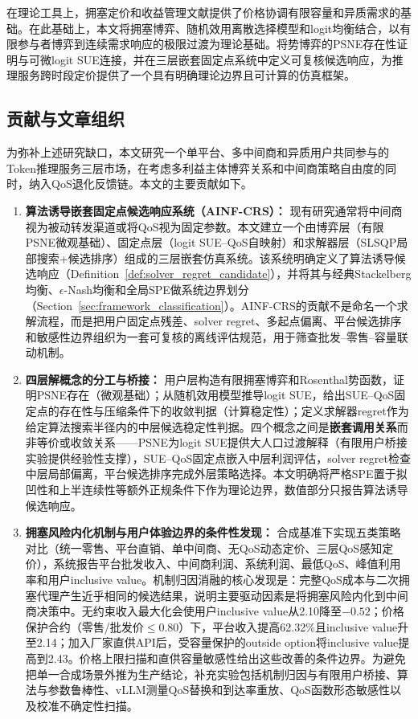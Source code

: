 \documentclass[UTF8,11pt]{ctexart}
\begin{document}
在理论工具上，拥塞定价和收益管理文献提供了价格协调有限容量和异质需求的基础\cite{vickrey1969congestion,gallego1994dynamic,elmaghraby2003dynamic,bitran2003overview,talluri2004revenue,phillips2005pricing}。在此基础上，本文将拥塞博弈、随机效用离散选择模型和logit均衡结合，以有限参与者博弈到连续需求响应的极限过渡为理论基础\cite{rosenthal1973class,monderer1996potential,wardrop1952some,sandholm2010population,mcfadden1974conditional,train2009discrete}。将势博弈的PSNE存在性证明与可微logit SUE连接，并在三层嵌套固定点系统中定义可复核候选响应，为推理服务跨时段定价提供了一个具有明确理论边界且可计算的仿真框架。

\subsection{贡献与文章组织}

为弥补上述研究缺口，本文研究一个单平台、多中间商和异质用户共同参与的Token推理服务三层市场，在考虑多利益主体博弈关系和中间商策略自由度的同时，纳入QoS退化反馈链。本文的主要贡献如下。

\begin{enumerate}[leftmargin=2em]
  \item \textbf{算法诱导嵌套固定点候选响应系统（AINF-CRS）：} 现有研究通常将中间商视为被动转发渠道或将QoS视为固定参数。本文建立一个由博弈层（有限PSNE微观基础）、固定点层（logit SUE--QoS自映射）和求解器层（SLSQP局部搜索+候选排序）组成的三层嵌套仿真系统。该系统明确定义了算法诱导候选响应（Definition~\ref{def:solver_regret_candidate}），并将其与经典Stackelberg均衡、$\epsilon$-Nash均衡和全局SPE做系统边界划分（Section~\ref{sec:framework_classification}）。AINF-CRS的贡献不是命名一个求解流程，而是把用户固定点残差、solver regret、多起点偏离、平台候选排序和敏感性边界组织为一套可复核的离线评估规范，用于筛查批发--零售--容量联动机制。
  \item \textbf{四层解概念的分工与桥接：} 用户层构造有限拥塞博弈和Rosenthal势函数，证明PSNE存在（微观基础）；从随机效用模型推导logit SUE，给出SUE--QoS固定点的存在性与压缩条件下的收敛判据（计算稳定性）；定义求解器regret作为给定算法搜索半径内的中层候选稳定性判据。四个概念之间是\textbf{嵌套调用关系}而非等价或收敛关系——PSNE为logit SUE提供大人口过渡解释（有限用户桥接实验提供经验性支撑），SUE--QoS固定点嵌入中层利润评估，solver regret检查中层局部偏离，平台候选排序完成外层策略选择。本文明确将严格SPE置于拟凹性和上半连续性等额外正规条件下作为理论边界，数值部分只报告算法诱导候选响应。
  \item \textbf{拥塞风险内化机制与用户体验边界的条件性发现：} 合成基准下实现五类策略对比（统一零售、平台直销、单中间商、无QoS动态定价、三层QoS感知定价），系统报告平台批发收入、中间商利润、系统利润、最低QoS、峰值利用率和用户inclusive value。机制归因消融的核心发现是：完整QoS成本与二次拥塞代理产生近乎相同的候选结果，说明主要驱动因素是将拥塞风险内化到中间商决策中。无约束收入最大化会使用户inclusive value从2.10降至$-0.52$；价格保护合约（零售/批发价$\le 0.80$）下，平台收入提高62.32\%且inclusive value升至2.14；加入厂家直供API后，受容量保护的outside option将inclusive value提高到2.43。价格上限扫描和直供容量敏感性给出这些改善的条件边界。为避免把单一合成场景外推为生产结论，补充实验包括机制归因与有限用户桥接、算法与参数鲁棒性、vLLM测量QoS替换和到达率重放、QoS函数形态敏感性以及校准不确定性扫描。
\end{enumerate}
\end{document}
